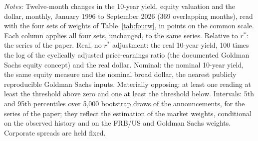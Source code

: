 \begin{table}[tbp]
\begin{flushleft}\footnotesize\textit{Notes:} Twelve-month changes in the 10-year yield, equity valuation and the dollar, monthly, January 1996 to September 2026 (369 overlapping months), read with the four sets of weights of Table~\ref{tab:fourw}, in points on the common scale. Each column applies all four sets, unchanged, to the same series. Relative to $r^*$: the series of the paper. Real, no $r^*$ adjustment: the real 10-year yield, 100 times the log of the cyclically adjusted price-earnings ratio (the documented Goldman Sachs equity concept) and the real dollar. Nominal: the nominal 10-year yield, the same equity measure and the nominal broad dollar, the nearest publicly reproducible Goldman Sachs inputs. Materially opposing: at least one reading at least the threshold above zero and one at least the threshold below. Intervals: 5th and 95th percentiles over 5,000 bootstrap draws of the announcements, for the series of the paper; they reflect the estimation of the market weights, conditional on the observed history and on the FRB/US and Goldman Sachs weights. Corporate spreads are held fixed.\end{flushleft}
\end{table}

